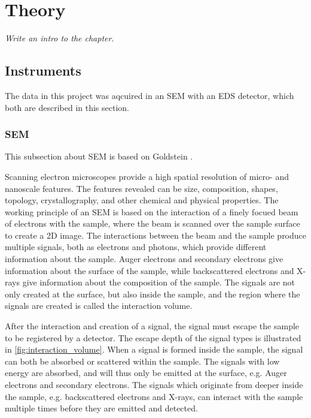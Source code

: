 \chapter{Theory}
\label{ch:theory}

\emph{Write an intro to the chapter}.

\section{Instruments}
\label{theory:instruments}

The data in this project was aqcuired in an SEM with an EDS detector, which both are described in this section.


\subsection{SEM}
\label{theory:instruments:sem}

This subsection about SEM is based on Goldstein \cite{goldstein_scanning_2018}.

Scanning electron microscopes provide a high spatial resolution of micro- and nanoscale features.
The features revealed can be size, composition, shapes, topology, crystallography, and other chemical and physical properties. %
The working principle of an SEM is based on the interaction of a finely focued beam of electrons with the sample, where the beam is scanned over the sample surface to create a 2D image.
The interactions between the beam and the sample produce multiple signals, both as electrons and photons, which provide different information about the sample.
Auger electrons and secondary electrons give information about the surface of the sample, while backscattered electrons and X-rays give information about the composition of the sample.
The signals are not only created at the surface, but also inside the sample, and the region where the signals are created is called the interaction volume.

After the interaction and creation of a signal, the signal must escape the sample to be registered by a detector.
The escape depth of the signal types is illustrated in \cref{fig:interaction_volume}.
When a signal is formed inside the sample, the signal can both be absorbed or scattered within the sample.
The signals with low energy are absorbed, and will thus only be emitted at the surface, e.g. Auger electrons and secondary electrons.
The signals which originate from deeper inside the sample, e.g. backscattered electrons and X-rays, can interact with the sample multiple times before they are emitted and detected.

